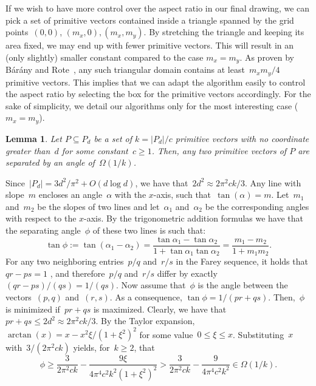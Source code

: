 \documentclass[a4paper,11pt]{article}
\newenvironment{proofMath}{\par\addvspace\topsep\noindent{\bf Proof:} \ignorespaces }{}
\theoremstyle{plain}
\newtheorem{lemma}{Lemma}
\begin{document}
If we wish to have more control over the aspect ratio in our final drawing, we 
can pick a set of primitive vectors contained inside a triangle spanned
by the grid points~$(0,0)$, $(m_x,0), (m_x,m_y)$. By stretching the triangle and 
keeping its area fixed, we may end up with fewer primitive vectors.
This will result in an (only slightly) smaller constant compared to
the case $m_x=m_y$.  
As proven by B\'ar\'any and Rote~\cite[Theorem~2]{br-scdpg-06}, any such
triangular domain contains at least~$m_x m_y / 4$ primitive
vectors. This implies that we can adapt
the algorithm easily to control the
aspect ratio by selecting the box for the primitive vectors 
accordingly. For the sake of simplicity, we detail our algorithms only
for the most interesting case ($m_x=m_y$).

\begin{lemma}\label{lem:primitive_angles}
  Let $P\subseteq P_d$ be a set of $k=|P_d|/c$ primitive vectors with
  no coordinate greater than~$d$ for some constant~$c\ge 1$.  Then, any
  two primitive vectors of $P$ are separated by an angle of~$\Omega(1/k)$.
\end{lemma}

\begin{proofMath}
Since~$|P_d|=3d^2/\pi^2 + O(d \log d)$, we have that~$2d^2 \approx 2\pi^2 ck/3$.
Any line with slope~$m$ encloses an angle~$\alpha$ with the $x$-axis, 
such that~$\tan(\alpha)=m$. Let~$m_1$ and~$m_2$ be the slopes of two lines 
and let~$\alpha_1$ and~$\alpha_2$ be the corresponding angles with respect to 
the $x$-axis. By the trigonometric addition formulas we have that the 
separating angle~$\phi$ of these two lines is such that:
$$\tan \phi := \tan(\alpha_1-\alpha_2) 
= \frac{\tan\alpha_1-\tan\alpha_2}{1+ \tan \alpha_1 \tan \alpha_2} 
= \frac{m_1 - m_2}{1+m_1m_2}.$$ 
For any two neighboring entries~$p/q$ and~$r/s$ in 
the Farey sequence, it holds that $qr-ps=1$ \cite[Theorem~3.1.2]{gw-itn-79}, and 
therefore~$p/q$ and~$r/s$  differ by exactly~$(qr-ps)/(qs)=1/(qs)$.  Now assume that~$\phi$ is the angle 
between the vectors~$(p,q)$ and~$(r,s)$.  As a 
consequence, $\tan \phi = 1/(pr+qs)$. Then,~$\phi$ is minimized if~$pr+qs$
is maximized. Clearly, we have that~$pr+qs\le 2d^2\approx 2 \pi^2c k /3$. By 
the Taylor expansion, $\arctan(x)= x - x^2 \xi /(1+\xi^2)^2$ for some 
value~$0 \le \xi \le x$. Substituting~$x$ with~$3 /(2\pi^2 c k)$ yields, 
for~$k\ge2$, that
\[\phi \ge \frac{3}{2 \pi^2c k} - \frac{9 \xi}{4 \pi^4 c^2 k^2 (1+\xi^2)^2}
> \frac{3}{2 \pi^2 c k} - \frac{9}{ 4 \pi^4 c^2 k^2} \in \Omega(1/k).
  \tag*{$\Box$}\]
\end{proofMath}
\end{document}
